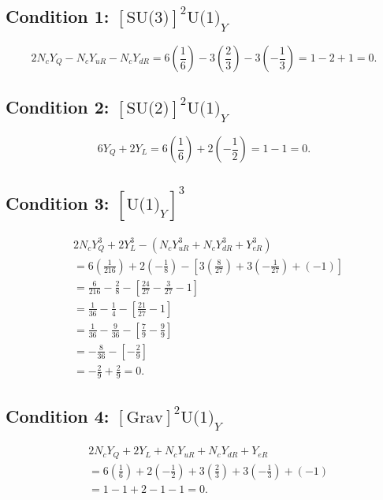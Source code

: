 \subsection*{Condition 1: \([\text{SU(3)}]^2\text{U(1)}_Y\)}

\[
2N_c Y_Q - N_c Y_{uR} - N_c Y_{dR}
= 6\!\left(\frac16\right) - 3\!\left(\frac23\right) - 3\!\left(-\frac13\right)
= 1 - 2 + 1 = 0.
\]

\subsection*{Condition 2: \([\text{SU(2)}]^2\text{U(1)}_Y\)}

\[
6Y_Q + 2Y_L
= 6\!\left(\frac16\right) + 2\!\left(-\frac12\right)
= 1 - 1 = 0.
\]

\subsection*{Condition 3: \([\text{U(1)}_Y]^3\)}

\[
\begin{aligned}
& 2N_c Y_Q^3 + 2Y_L^3 - \left(N_c Y_{uR}^3 + N_c Y_{dR}^3 + Y_{eR}^3\right) \\
&= 6\!\left(\frac{1}{216}\right) + 2\!\left(-\frac{1}{8}\right)
   - \left[3\!\left(\frac{8}{27}\right) + 3\!\left(-\frac{1}{27}\right) + (-1)\right] \\[4pt]
&= \frac{6}{216} - \frac{2}{8} - \left[\frac{24}{27} - \frac{3}{27} - 1\right] \\[4pt]
&= \frac{1}{36} - \frac{1}{4} - \left[\frac{21}{27} - 1\right] \\[4pt]
&= \frac{1}{36} - \frac{9}{36} - \left[\frac{7}{9} - \frac{9}{9}\right] \\[4pt]
&= -\frac{8}{36} - \left[-\frac{2}{9}\right] \\[4pt]
&= -\frac{2}{9} + \frac{2}{9} = 0.
\end{aligned}
\]

\subsection*{Condition 4: \([\text{Grav}]^2\text{U(1)}_Y\)}

\[
\begin{aligned}
& 2N_c Y_Q + 2Y_L + N_c Y_{uR} + N_c Y_{dR} + Y_{eR} \\
&= 6\!\left(\frac16\right) + 2\!\left(-\frac12\right)
   + 3\!\left(\frac23\right) + 3\!\left(-\frac13\right) + (-1) \\[4pt]
&= 1 - 1 + 2 - 1 - 1 = 0.
\end{aligned}
\]

